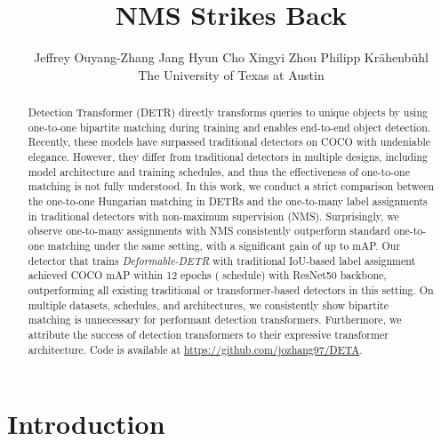 \documentclass[10pt,twocolumn,letterpaper]{article}
\newcommand{\ddetr}{{\textit{Deformable-DETR}}\xspace}
\begin{document}
\title{NMS Strikes Back}

\author{Jeffrey Ouyang-Zhang \quad
Jang Hyun Cho \quad
Xingyi Zhou \quad 
Philipp Kr\"ahenb\"uhl \vspace{3mm}\\
The University of Texas at Austin
}
\maketitle

\begin{abstract}
Detection Transformer (DETR) directly transforms queries to unique objects by using one-to-one bipartite matching during training and enables end-to-end object detection.
Recently, these models have surpassed traditional detectors on COCO with undeniable elegance.
However, they differ from traditional detectors in multiple designs,
including model architecture and training schedules,
and thus the effectiveness of one-to-one matching is not fully understood.
In this work, we conduct a strict comparison between the one-to-one Hungarian matching in DETRs and the one-to-many label assignments in traditional detectors with non-maximum supervision (NMS).
Surprisingly, we observe one-to-many assignments with NMS consistently outperform standard one-to-one matching under the same setting, with a significant gain of up to  mAP.
Our detector that trains \ddetr{} with traditional IoU-based label assignment achieved  COCO mAP within 12 epochs ( schedule) with ResNet50 backbone, outperforming all existing traditional or transformer-based detectors in this setting.
On multiple datasets, schedules, and architectures, we consistently show bipartite matching is unnecessary for performant detection transformers.
Furthermore, we attribute the success of detection transformers to their expressive transformer architecture.
Code is available at \href{https://github.com/jozhang97/DETA}{https://github.com/jozhang97/DETA}.
\end{abstract}


\section{Introduction}
\end{document}
